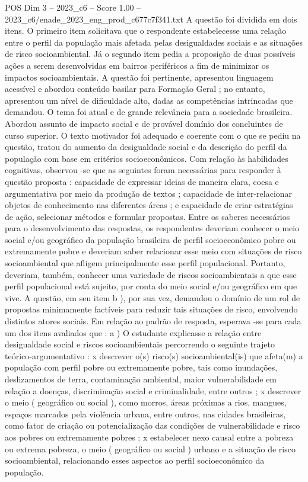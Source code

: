 \begin{textsample}{POS Dim 3 – 2023\_c6 – Score 1.00 – 2023\_c6/enade\_2023\_eng\_prod\_c677c7f341.txt}
A questão foi dividida em dois itens.
O primeiro item solicitava que o respondente estabelecesse uma relação entre o perfil da população mais afetada pelas desigualdades sociais e as situações de risco socioambiental.
Já o segundo item pedia a proposição de duas possíveis ações a serem desenvolvidas em bairros periféricos a fim de minimizar os impactos socioambientais.
A questão foi pertinente, apresentou linguagem acessível e abordou conteúdo basilar para Formação Geral ; no entanto, apresentou um nível de dificuldade alto, dadas as competências intrincadas que demandou.
O tema foi atual e de grande relevância para a sociedade brasileira.
Abordou assunto de impacto social e de provável domínio dos concluintes de curso superior.
O texto motivador foi adequado e coerente com o que se pediu na questão, tratou do aumento da desigualdade social e da descrição do perfil da população com base em critérios socioeconômicos.
Com relação às habilidades cognitivas, observou -se que as seguintes foram necessárias para responder à questão proposta : capacidade de expressar ideias de maneira clara, coesa e argumentativa por meio da produção de textos ; capacidade de inter-relacionar objetos de conhecimento nas diferentes áreas ; e capacidade de criar estratégias de ação, selecionar métodos e formular propostas.
Entre os saberes necessários para o desenvolvimento das respostas, os respondentes deveriam conhecer o meio social e/ou geográfico da população brasileira de perfil socioeconômico pobre ou extremamente pobre e deveriam saber relacionar esse meio com situações de risco socioambiental que afligem principalmente esse perfil populacional.
Portanto, deveriam, também, conhecer uma variedade de riscos socioambientais a que esse perfil populacional está sujeito, por conta do meio social e/ou geográfico em que vive.
A questão, em seu item b ), por sua vez, demandou o domínio de um rol de propostas minimamente factíveis para reduzir tais situações de risco, envolvendo distintos atores sociais.
Em relação ao padrão de resposta, esperava -se para cada um dos itens avaliados que : a ) O estudante explicasse a relação entre desigualdade social e riscos socioambientais percorrendo o seguinte trajeto teórico-argumentativo : x descrever o(s) risco(s) socioambiental(is) que afeta(m) a população com perfil pobre ou extremamente pobre, tais como inundações, deslizamentos de terra, contaminação ambiental, maior vulnerabilidade em relação a doenças, discriminação social e criminalidade, entre outros ; x descrever o meio ( geográfico ou social ), como morros, áreas próximas a rios, mangues, espaços marcados pela violência urbana, entre outros, nas cidades brasileiras, como fator de criação ou potencialização das condições de vulnerabilidade e risco aos pobres ou extremamente pobres ; x estabelecer nexo causal entre a pobreza ou extrema pobreza, o meio ( geográfico ou social ) urbano e a situação de risco socioambiental, relacionando esses aspectos ao perfil socioeconômico da população.

\end{textsample}
